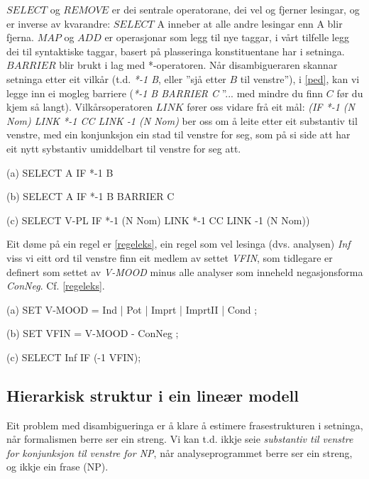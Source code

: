 \documentclass[a4paper,nynorsk]{article}
\begin{document}
$SELECT$ og $REMOVE$ er dei sentrale operatorane, dei vel og fjerner lesingar, og er inverse av kvarandre: $SELECT$ A inneber at alle andre lesingar enn A blir fjerna. $MAP$ og $ADD$ er operasjonar som legg til nye taggar, i vårt tilfelle legg dei til syntaktiske taggar, basert på plasseringa konstituentane har i setninga. $BARRIER$ blir brukt i lag med *-operatoren. Når disambigueraren skannar setninga etter eit vilkår (t.d. \textit{*-1 B}, eller ''sjå etter $B$ til venstre''), i \ref{ped}, kan vi legge inn ei mogleg barriere  (\textit{*-1 B BARRIER C} ''... med mindre du finn $C$ før du kjem så langt). Vilkårsoperatoren $LINK$ fører oss vidare frå eit mål: \textit{(IF *-1 (N Nom) LINK *-1 CC LINK -1 (N Nom)} ber oss om å leite etter eit substantiv til venstre, med ein konjunksjon ein stad til venstre for seg, som på si side att har eit nytt sybstantiv umiddelbart til venstre for seg att.%

\begin{example}\label{ped}
\item[(a)] SELECT A IF *-1 B
\item[(b)] SELECT A IF *-1 B BARRIER C
\item[(c)] SELECT V-PL IF *-1 (N Nom) LINK *-1 CC LINK -1 (N Nom))
\end{example}

Eit døme på ein regel er \ref{regeleks}, ein regel som vel lesinga (dvs. analysen) \emph{Inf} viss vi eitt ord til venstre finn eit medlem av settet \emph{VFIN}, som  tidlegare er definert som settet av \emph{V-MOOD} minus alle analyser som inneheld negasjonsforma \emph{ConNeg}. Cf. \ref{regeleks}.  %

\begin{example}\label{regeleks}
\item[(a)] SET V-MOOD = Ind | Pot | Imprt | ImprtII | Cond ; 
\item[(b)] SET VFIN  =  V-MOOD - ConNeg ; 
\item[(c)] SELECT Inf IF (-1 VFIN); 
\end{example}%

\subsection{Hierarkisk struktur i ein lineær modell}

Eit problem med disambigueringa er å klare å estimere frasestrukturen i setninga, når formalismen berre ser ein streng. Vi kan t.d. ikkje seie \textit{substantiv til venstre for konjunksjon til venstre for NP}, når analyseprogrammet berre ser ein streng, og ikkje ein frase (NP). %
\end{document}
